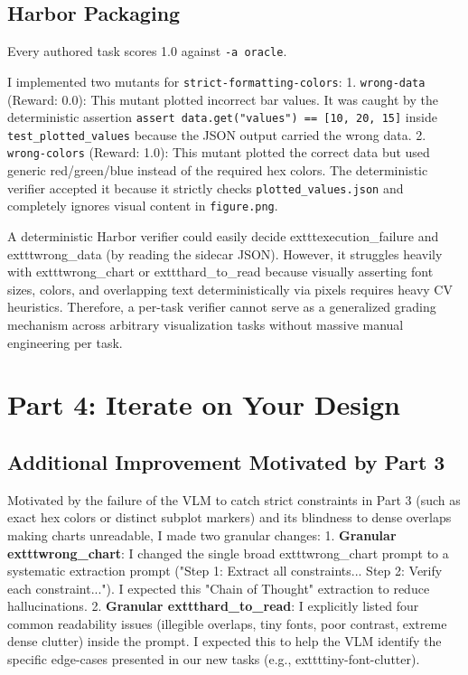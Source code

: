\documentclass[11pt]{article}
\begin{document}
\subsection{Harbor Packaging}
Every authored task scores 1.0 against \texttt{-a oracle}.

I implemented two mutants for \texttt{strict-formatting-colors}:
1. \texttt{wrong-data} (Reward: 0.0): This mutant plotted incorrect bar values. It was caught by the deterministic assertion \texttt{assert data.get("values") == [10, 20, 15]} inside \texttt{test\_plotted\_values} because the JSON output carried the wrong data.
2. \texttt{wrong-colors} (Reward: 1.0): This mutant plotted the correct data but used generic red/green/blue instead of the required hex colors. The deterministic verifier accepted it because it strictly checks \texttt{plotted\_values.json} and completely ignores visual content in \texttt{figure.png}.

A deterministic Harbor verifier could easily decide 	exttt{execution\_failure} and 	exttt{wrong\_data} (by reading the sidecar JSON). However, it struggles heavily with 	exttt{wrong\_chart} or 	exttt{hard\_to\_read} because visually asserting font sizes, colors, and overlapping text deterministically via pixels requires heavy CV heuristics. Therefore, a per-task verifier cannot serve as a generalized grading mechanism across arbitrary visualization tasks without massive manual engineering per task.

\section{Part 4: Iterate on Your Design}

\subsection{Additional Improvement Motivated by Part 3}
Motivated by the failure of the VLM to catch strict constraints in Part 3 (such as exact hex colors or distinct subplot markers) and its blindness to dense overlaps making charts unreadable, I made two granular changes:
1. \textbf{Granular 	exttt{wrong\_chart}}: I changed the single broad 	exttt{wrong\_chart} prompt to a systematic extraction prompt ("Step 1: Extract all constraints... Step 2: Verify each constraint..."). I expected this "Chain of Thought" extraction to reduce hallucinations.
2. \textbf{Granular 	exttt{hard\_to\_read}}: I explicitly listed four common readability issues (illegible overlaps, tiny fonts, poor contrast, extreme dense clutter) inside the prompt. I expected this to help the VLM identify the specific edge-cases presented in our new tasks (e.g., 	exttt{tiny-font-clutter}).
\end{document}
